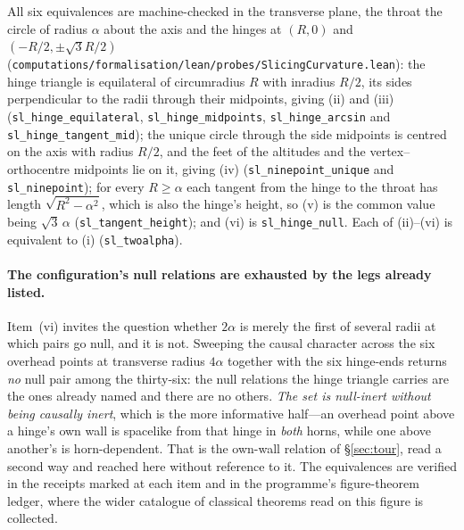 \documentclass[11pt,a4paper]{article}
\theoremstyle{definition}
\begin{document}
All six equivalences are machine-checked in the transverse plane, the throat the circle of radius $\alpha$ about the axis and the hinges at $(R,0)$ and $(-R/2,\pm\sqrt3R/2)$ (\texttt{computations/formalisation/lean/probes/SlicingCurvature.lean}): the hinge triangle is equilateral of circumradius $R$ with inradius $R/2$, its sides perpendicular to the radii through their midpoints, giving (ii) and (iii) (\texttt{sl\_hinge\_equilateral}, \texttt{sl\_hinge\_midpoints}, \texttt{sl\_hinge\_arcsin} and \texttt{sl\_hinge\_tangent\_mid}); the unique circle through the side midpoints is centred on the axis with radius $R/2$, and the feet of the altitudes and the vertex--orthocentre midpoints lie on it, giving (iv) (\texttt{sl\_ninepoint\_unique} and \texttt{sl\_ninepoint}); for every $R\ge\alpha$ each tangent from the hinge to the throat has length $\sqrt{R^{2}-\alpha^{2}}$, which is also the hinge's height, so (v) is the common value being $\sqrt3\,\alpha$ (\texttt{sl\_tangent\_height}); and (vi) is \texttt{sl\_hinge\_null}. Each of (ii)--(vi) is equivalent to (i) (\texttt{sl\_twoalpha}).

\paragraph{The configuration's null relations are exhausted by the legs already listed.} Item~(vi) invites the question whether $2\alpha$ is merely the first of several radii at which pairs go null, and it is not. Sweeping the causal character across the six overhead points at transverse radius $4\alpha$ together with the six hinge-ends returns \emph{no} null pair among the thirty-six: the null relations the hinge triangle carries are the ones already named and there are no others. \emph{The set is null-inert without being causally inert}, which is the more informative half---an overhead point above a hinge's own wall is spacelike from that hinge in \emph{both} horns, while one above another's is horn-dependent. That is the own-wall relation of \S\ref{sec:tour}, read a second way and reached here without reference to it. The equivalences are verified in the receipts marked at each item and in the programme's figure-theorem ledger, where the wider catalogue of classical theorems read on this figure is collected.
\end{document}
